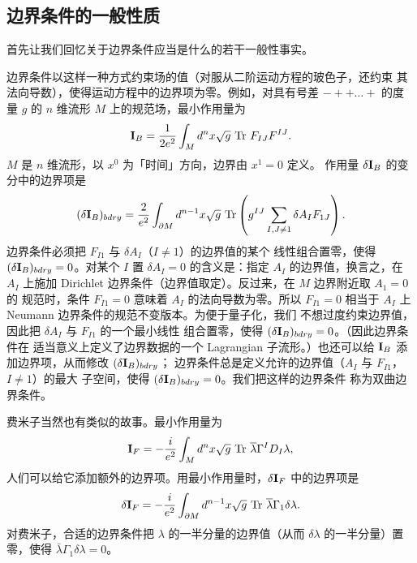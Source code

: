 \subsection{边界条件的一般性质}

首先让我们回忆关于边界条件应当是什么的若干一般性事实。

边界条件以这样一种方式约束场的值（对服从二阶运动方程的玻色子，还约束
其法向导数），使得运动方程中的边界项为零。例如，对具有号差
$-++\dots+$ 的度量 $g$ 的 $n$ 维流形 $M$ 上的规范场，最小作用量为 %
\setcounter{equation}{1}
\begin{equation}\label{eq:upco}
{{{\mathbf{I}}}}_B={1\over 2e^2}\int_M
d^nx \sqrt g\,\operatorname{Tr} \,F_{IJ}F^{IJ}.
\end{equation}
 $M$ 是 $n$ 维流形，以 $x^0$ 为「时间」方向，边界由 $x^1=0$ 定义。
作用量 $\delta {{{\mathbf{I}}}}_B$ 的变分中的边界项是 %
\setcounter{equation}{2}
\begin{equation}\label{eq:ofof}
(\delta {{\mathbf{I}}}_B)_{bdry}={2\over e^2}\int_{\partial M}d^{n-1}x \sqrt
g\,\operatorname{Tr}\left(g^{IJ}\sum_{I,J\not=1}\delta A_I F_{1J}\right).
\end{equation}
 边界条件必须把 $F_{I1}$ 与 $\delta A_I$（$I\not= 1$）的边界值的某个
线性组合置零，使得 $(\delta {{{\mathbf{I}}}}_B)_{bdry}=0$。对某个 $I$ 置
$\delta A_I=0$ 的含义是：指定 $A_I$ 的边界值，换言之，在 $A_I$ 上施加
Dirichlet 边界条件（边界值取定）。反过来，在 $M$ 边界附近取 $A_1=0$ 的
规范时，条件 $F_{I1}=0$ 意味着 $A_I$ 的法向导数为零。所以 $F_{I1}=0$
相当于 $A_I$ 上 Neumann 边界条件的规范不变版本。为便于量子化，我们
不想过度约束边界值，因此把 $\delta A_I$ 与 $F_{I1}$ 的一个最小线性
组合置零，使得 $(\delta {{{\mathbf{I}}}}_B)_{bdry}=0$。（因此边界条件在
适当意义上定义了边界数据的一个 Lagrangian 子流形。）也还可以给
${{{\mathbf{I}}}}_B$ 添加边界项，从而修改 $(\delta {{{\mathbf{I}}}}_B)_{bdry}$；
边界条件总是定义允许的边界值（$A_I$ 与 $F_{I1}$，$I\not= 1$）的最大
子空间，使得 $(\delta {{{\mathbf{I}}}}_B)_{bdry}=0$。我们把这样的边界条件
称为双曲边界条件。

费米子当然也有类似的故事。最小作用量为 %
\setcounter{equation}{3}
\begin{equation}\label{eq:olpo}
{{{\mathbf{I}}}}_F=-{i\over e^2}\int_M d^nx \sqrt
g\,\operatorname{Tr}\,{\overline\lambda} \Gamma^I D_I\lambda,
\end{equation}
 人们可以给它添加额外的边界项。用最小作用量时，$\delta {{{\mathbf{I}}}}_F$ 中的边界项是 %
\setcounter{equation}{4}
\begin{equation}\label{eq:rolpo}
\delta
{{{\mathbf{I}}}}_F=-{i\over e^2}\int_{\partial M}d^{n-1}x\sqrt
g\,\operatorname{Tr}\,{\overline \lambda} \Gamma_1\delta\lambda.
\end{equation}
 对费米子，合适的边界条件把 $\lambda$ 的一半分量的边界值（从而
$\delta\lambda$ 的一半分量）置零，使得 ${\bar \lambda}
\Gamma_1\delta\lambda=0$。

